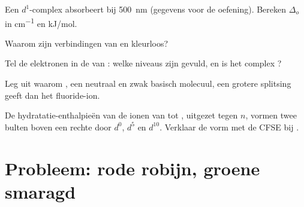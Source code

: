 \begin{exercise}[$\star\star$]\label{exo:b2:ligand-field:8}
Een $d^1$-complex absorbeert bij \qty{500}{nm} (gegevens voor de oefening). Bereken $\Delta_o$ in \unit{cm^{-1}} en
\unit{kJ/mol}.
\end{exercise}

\begin{exercise}[$\star\star$]\label{exo:b2:ligand-field:9}
Waarom zijn verbindingen van  en  kleurloos?
\end{exercise}

\begin{exercise}[$\star\star\star$]\label{exo:b2:ligand-field:10}
Tel de elektronen in de  van : welke niveaus zijn gevuld,
en is het complex ?
\end{exercise}

\begin{exercise}[$\star\star\star$]\label{exo:b2:ligand-field:11}
Leg uit waarom , een neutraal en zwak basisch molecuul, een grotere splitsing geeft dan
het fluoride-ion.
\end{exercise}

\begin{exercise}[$\star\star\star$]\label{exo:b2:ligand-field:12}
De hydratatie-enthalpieën van de ionen  van  tot , uitgezet tegen $n$, vormen
twee bulten boven een rechte door $d^0$, $d^5$ en $d^{10}$. Verklaar de vorm met de
CFSE bij .
\end{exercise}

\section{Probleem: rode robijn, groene smaragd}

